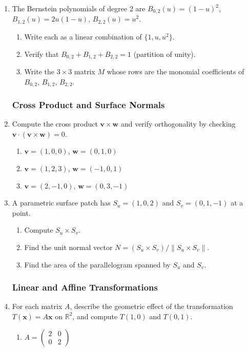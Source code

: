 \begin{enumerate}
\item The Bernstein polynomials of degree 2 are
$B_{0,2}(u) = (1-u)^2$, $B_{1,2}(u) = 2u(1-u)$, $B_{2,2}(u) = u^2$.
\begin{enumerate}
  \item Write each as a linear combination of $\{1, u, u^2\}$.
  \item Verify that $B_{0,2} + B_{1,2} + B_{2,2} = 1$ (partition of unity).
  \item Write the $3 \times 3$ matrix $M$ whose rows are the monomial
        coefficients of $B_{0,2}$, $B_{1,2}$, $B_{2,2}$.
\end{enumerate}

\subsubsection*{Cross Product and Surface Normals}

\item Compute the cross product $\mathbf{v} \times \mathbf{w}$ and verify orthogonality
by checking $\mathbf{v} \cdot (\mathbf{v} \times \mathbf{w}) = 0$.
\begin{enumerate}
  \item $\mathbf{v} = (1, 0, 0)$, $\mathbf{w} = (0, 1, 0)$
  \item $\mathbf{v} = (1, 2, 3)$, $\mathbf{w} = (-1, 0, 1)$
  \item $\mathbf{v} = (2, -1, 0)$, $\mathbf{w} = (0, 3, -1)$
\end{enumerate}

\item A parametric surface patch has $S_u = (1, 0, 2)$ and $S_v = (0, 1, -1)$
at a point.
\begin{enumerate}
  \item Compute $S_u \times S_v$.
  \item Find the unit normal vector $N = (S_u \times S_v)/\|S_u \times S_v\|$.
  \item Find the area of the parallelogram spanned by $S_u$ and $S_v$.
\end{enumerate}

\subsubsection*{Linear and Affine Transformations}

\item For each matrix $A$, describe the geometric effect of the transformation
$T(\mathbf{x}) = A\mathbf{x}$ on $\mathbb{R}^2$, and compute $T(1, 0)$ and $T(0, 1)$.
\begin{enumerate}
  \item $A = \begin{pmatrix} 2 & 0 \\ 0 & 2 \end{pmatrix}$


\end{enumerate}
\end{enumerate}
